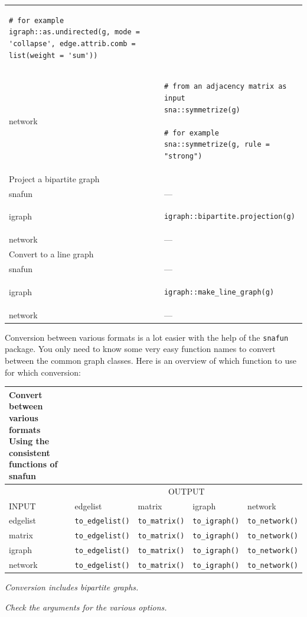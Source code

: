 \documentclass[
]{article}
\begin{document}
\begin{longtable}{ll}
\begin{verbatim}
# for example
igraph::as.undirected(g, mode = 'collapse', edge.attrib.comb = list(weight = 'sum'))
\end{verbatim} \\ 
network & \begin{verbatim}
# from an adjacency matrix as input
sna::symmetrize(g)

# for example
sna::symmetrize(g, rule = "strong")
\end{verbatim} \\ 
\midrule
\multicolumn{1}{l}{Project a bipartite graph} \\ 
\midrule
snafun & — \\ 
igraph & \begin{verbatim}
igraph::bipartite.projection(g)
\end{verbatim} \\ 
network & — \\ 
\midrule
\multicolumn{1}{l}{Convert to a line graph} \\ 
\midrule
snafun & — \\ 
igraph & \begin{verbatim}
igraph::make_line_graph(g)
\end{verbatim} \\ 
network & — \\ 
\bottomrule
\end{longtable}

Conversion between various formats is a lot easier with the help of the
\texttt{snafun} package. You only need to know some very easy function
names to convert between the common graph classes. Here is an overview
of which function to use for which conversion:

\captionsetup[table]{labelformat=empty,skip=1pt}
\setlength{\LTpost}{0mm}
\begin{longtable}{lllll}
\caption*{
{\large Convert between various formats} \\ 
{\small Using the consistent functions of \textbf{snafun}}
} \\ 
\toprule
 & \multicolumn{4}{c}{OUTPUT} \\ 
\cmidrule(lr){2-5}
INPUT & edgelist & matrix & igraph & network \\ 
\midrule
edgelist & \texttt{to\_edgelist()} & \texttt{to\_matrix()} & \texttt{to\_igraph()} & \texttt{to\_network()} \\ 
matrix & \texttt{to\_edgelist()} & \texttt{to\_matrix()} & \texttt{to\_igraph()} & \texttt{to\_network()} \\ 
igraph & \texttt{to\_edgelist()} & \texttt{to\_matrix()} & \texttt{to\_igraph()} & \texttt{to\_network()} \\ 
network & \texttt{to\_edgelist()} & \texttt{to\_matrix()} & \texttt{to\_igraph()} & \texttt{to\_network()} \\ 
\bottomrule
\end{longtable}
\begin{minipage}{\linewidth}
\emph{Conversion includes bipartite graphs.}

\emph{Check the arguments for the various options.}\\
\end{minipage}
\end{document}
